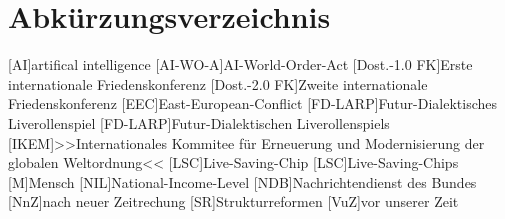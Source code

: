 \newpage
\thispagestyle{plain}
\chapter*{Abkürzungsverzeichnis}
\begin{acronym}
  [AI]{artifical intelligence}
  [AI-WO-A]{AI-World-Order-Act}
	[Dost.-1.0 FK]{Erste internationale Friedenskonferenz}
	[Dost.-2.0 FK]{Zweite internationale Friedenskonferenz}
  [EEC]{East-European-Conflict}
	[FD-LARP]{Futur-Dialektisches Liverollenspiel}
	[FD-LARP]{Futur-Dialektischen Liverollenspiels}
  [IKEM]{>>Internationales Kommitee für Erneuerung und Modernisierung
  der globalen Weltordnung<<}
	[LSC]{Live-Saving-Chip}
	[LSC]{Live-Saving-Chips}
	{Mensch}
	[NIL]{National-Income-Level}
	[NDB]{Nach\-rich\-ten\-dienst des Bundes}
	[NnZ]{nach neuer Zeitrechung}
	[SR]{Strukturreformen}
	[VuZ]{vor unserer Zeit}
\end{acronym}


